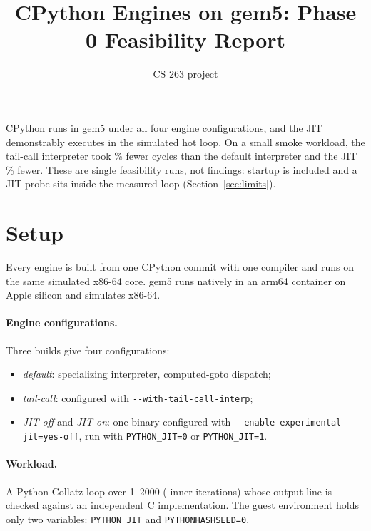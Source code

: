 \documentclass[11pt]{article}
\title{CPython Engines on gem5: Phase 0 Feasibility Report}
\author{CS 263 project}
\date{}
\providecommand{\GeneratedDir}{../build/report/generated}
\begin{document}
\maketitle

\noindent CPython \CPythonTag{} runs in gem5 under all four engine configurations, and the JIT demonstrably executes in the simulated hot loop.
On a small smoke workload, the tail-call interpreter took \CycleSavingPctTailCall\% fewer cycles than the default interpreter and the JIT \CycleSavingPctJitOn\% fewer.
These are single feasibility runs, not findings: startup is included and a JIT probe sits inside the measured loop (Section~\ref{sec:limits}).

\section{Setup}

Every engine is built from one CPython commit with one compiler and runs on the same simulated x86-64 core.
gem5 runs natively in an arm64 container on Apple silicon and simulates x86-64.

\begin{table}[H]
\centering\small

\caption{Pinned inputs.}
\end{table}

\paragraph{Engine configurations.} Three builds give four configurations:
\begin{itemize}
  \item \emph{default}: specializing interpreter, computed-goto dispatch;
  \item \emph{tail-call}: configured with \texttt{-{}-with-tail-call-interp};
  \item \emph{JIT off} and \emph{JIT on}: one binary configured with \texttt{-{}-enable-experimental-jit=yes-off}, run with \texttt{PYTHON\_JIT=0} or \texttt{PYTHON\_JIT=1}.
\end{itemize}

\paragraph{Workload.} A Python Collatz loop over 1--2000 (\InnerIterations{} inner iterations) whose output line is checked against an independent C implementation.
The guest environment holds only two variables: \texttt{PYTHON\_JIT} and \texttt{PYTHONHASHSEED=0}.
\end{document}
